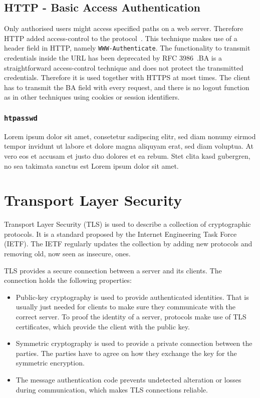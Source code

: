 \subsection{HTTP - Basic Access Authentication}

Only authorised users might access specified paths on a web server. Therefore
HTTP added access-control to the protocol~. This
technique makes use of a header field in HTTP, namely \texttt{WWW-Authenticate}.
The functionality to transmit credentials inside the URL has been deprecated by
RFC 3986~.BA is a straightforward access-control
technique and does not protect the transmitted credentials. Therefore it is used
together with HTTPS at most times. The client has to transmit the BA field with
every request, and there is no logout function as in other techniques using
cookies or session identifiers.

\subsubsection{\texttt{htpasswd}}

Lorem ipsum dolor sit amet, consetetur sadipscing elitr, sed diam nonumy eirmod
tempor invidunt ut labore et dolore magna aliquyam erat, sed diam voluptua. At
vero eos et accusam et justo duo dolores et ea rebum. Stet clita kasd gubergren,
no sea takimata sanctus est Lorem ipsum dolor sit amet.

\section{Transport Layer Security}

Transport Layer Security (TLS) is used to describe a collection of cryptographic
protocols. It is a standard proposed by the Internet Engineering Task Force
(IETF). The IETF regularly updates the collection by adding new protocols and
removing old, now seen as insecure, ones.

TLS provides a secure connection between a server and its clients. The
connection holds the following properties:
\begin{itemize}
  \item Public-key cryptography is used to provide authenticated identities.
  That is usually just needed for clients to make sure they communicate with the
  correct server. To proof the identity of a server, protocols make use of TLS
  certificates, which provide the client with the public key.
  \item Symmetric cryptography is used to provide a private connection between
  the parties. The parties have to agree on how they exchange the key for the
  symmetric encryption.
  \item The message authentication code prevents undetected alteration
  or losses during communication, which makes TLS connections reliable.
\end{itemize}

